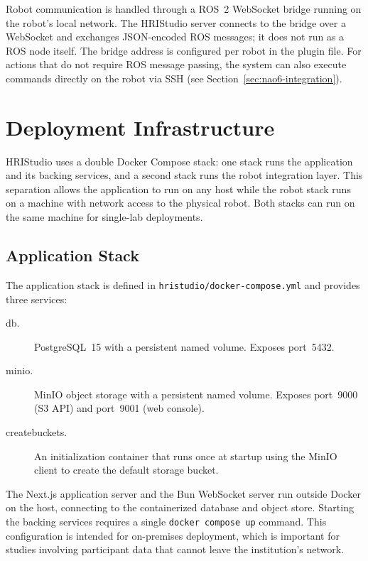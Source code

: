 Robot communication is handled through a ROS~2 WebSocket bridge running on the robot's local network. The HRIStudio server connects to the bridge over a WebSocket and exchanges JSON-encoded ROS messages; it does not run as a ROS node itself. The bridge address is configured per robot in the plugin file. For actions that do not require ROS message passing, the system can also execute commands directly on the robot via SSH (see Section~\ref{sec:nao6-integration}).

\section{Deployment Infrastructure}
\label{sec:deployment}

HRIStudio uses a double Docker Compose stack: one stack runs the application and its backing services, and a second stack runs the robot integration layer. This separation allows the application to run on any host while the robot stack runs on a machine with network access to the physical robot. Both stacks can run on the same machine for single-lab deployments.

\subsection{Application Stack}

The application stack is defined in \texttt{hristudio/docker-compose.yml} and provides three services:

\begin{description}
\item[db.] PostgreSQL~15 with a persistent named volume. Exposes port~5432.
\item[minio.] MinIO object storage with a persistent named volume. Exposes port~9000 (S3 API) and port~9001 (web console).
\item[createbuckets.] An initialization container that runs once at startup using the MinIO client to create the default storage bucket.
\end{description}

The Next.js application server and the Bun WebSocket server run outside Docker on the host, connecting to the containerized database and object store. Starting the backing services requires a single \texttt{docker compose up} command. This configuration is intended for on-premises deployment, which is important for studies involving participant data that cannot leave the institution's network.

